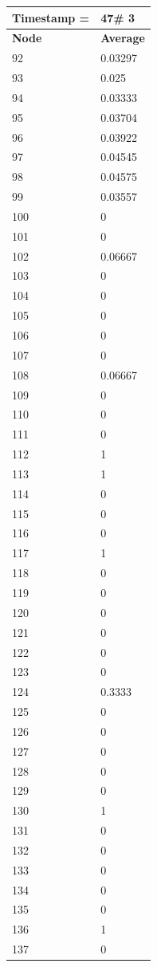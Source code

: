 \begin{tabular}{|l||l|}
\hline
\textbf{Timestamp =} & \textbf{47}\# 3\\\hline
	\textbf{Node} & \textbf{Average} \\ \hline
\hline
	92 & 0.03297 \\ \hline
	93 & 0.025 \\ \hline
	94 & 0.03333 \\ \hline
	95 & 0.03704 \\ \hline
	96 & 0.03922 \\ \hline
	97 & 0.04545 \\ \hline
	98 & 0.04575 \\ \hline
	99 & 0.03557 \\ \hline
	100 & 0 \\ \hline
	101 & 0 \\ \hline
	102 & 0.06667 \\ \hline
	103 & 0 \\ \hline
	104 & 0 \\ \hline
	105 & 0 \\ \hline
	106 & 0 \\ \hline
	107 & 0 \\ \hline
	108 & 0.06667 \\ \hline
	109 & 0 \\ \hline
	110 & 0 \\ \hline
	111 & 0 \\ \hline
	112 & 1 \\ \hline
	113 & 1 \\ \hline
	114 & 0 \\ \hline
	115 & 0 \\ \hline
	116 & 0 \\ \hline
	117 & 1 \\ \hline
	118 & 0 \\ \hline
	119 & 0 \\ \hline
	120 & 0 \\ \hline
	121 & 0 \\ \hline
	122 & 0 \\ \hline
	123 & 0 \\ \hline
	124 & 0.3333 \\ \hline
	125 & 0 \\ \hline
	126 & 0 \\ \hline
	127 & 0 \\ \hline
	128 & 0 \\ \hline
	129 & 0 \\ \hline
	130 & 1 \\ \hline
	131 & 0 \\ \hline
	132 & 0 \\ \hline
	133 & 0 \\ \hline
	134 & 0 \\ \hline
	135 & 0 \\ \hline
	136 & 1 \\ \hline
	137 & 0 \\ \hline
\end{tabular}


